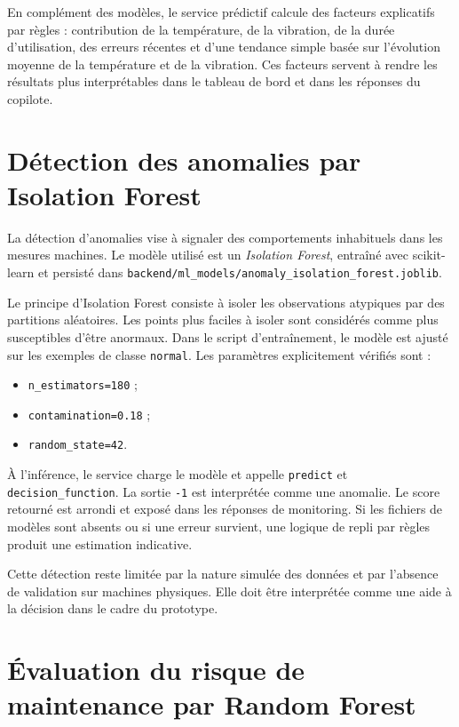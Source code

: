 En complément des modèles, le service prédictif calcule des facteurs explicatifs par règles : contribution de la température, de la vibration, de la durée d'utilisation, des erreurs récentes et d'une tendance simple basée sur l'évolution moyenne de la température et de la vibration. Ces facteurs servent à rendre les résultats plus interprétables dans le tableau de bord et dans les réponses du copilote.

\section{Détection des anomalies par Isolation Forest}

La détection d'anomalies vise à signaler des comportements inhabituels dans les mesures machines. Le modèle utilisé est un \textit{Isolation Forest}, entraîné avec scikit-learn et persisté dans \texttt{backend/ml\_models/anomaly\_isolation\_forest.joblib}.

Le principe d'Isolation Forest consiste à isoler les observations atypiques par des partitions aléatoires. Les points plus faciles à isoler sont considérés comme plus susceptibles d'être anormaux. Dans le script d'entraînement, le modèle est ajusté sur les exemples de classe \texttt{normal}. Les paramètres explicitement vérifiés sont :

\begin{itemize}
    \item \texttt{n\_estimators=180} ;
    \item \texttt{contamination=0.18} ;
    \item \texttt{random\_state=42}.
\end{itemize}

À l'inférence, le service charge le modèle et appelle \texttt{predict} et \texttt{decision\_function}. La sortie \texttt{-1} est interprétée comme une anomalie. Le score retourné est arrondi et exposé dans les réponses de monitoring. Si les fichiers de modèles sont absents ou si une erreur survient, une logique de repli par règles produit une estimation indicative.

Cette détection reste limitée par la nature simulée des données et par l'absence de validation sur machines physiques. Elle doit être interprétée comme une aide à la décision dans le cadre du prototype.

\section{Évaluation du risque de maintenance par Random Forest}

